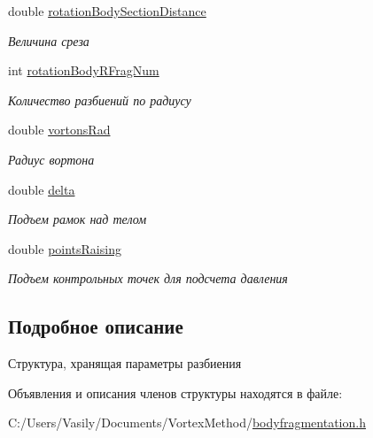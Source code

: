 \begin{DoxyCompactItemize}
double \mbox{\hyperlink{group__rotation_body_parameters_ga121bce6fb5cf863b3bd1e9249ee2b493}{rotation\+Body\+Section\+Distance}}
\begin{DoxyCompactList}\small\item\em Величина среза \end{DoxyCompactList}\item 
int \mbox{\hyperlink{group__rotation_bottom_cut_parameters_ga5e04e32e06f1344ec8761ec402b90ca6}{rotation\+Body\+R\+Frag\+Num}}
\begin{DoxyCompactList}\small\item\em Количество разбиений по радиусу \end{DoxyCompactList}\item 
double \mbox{\hyperlink{group__common_parameters_ga3d8bba533341948f927f1263580a5f17}{vortons\+Rad}}
\begin{DoxyCompactList}\small\item\em Радиус вортона \end{DoxyCompactList}\item 
double \mbox{\hyperlink{group__common_parameters_gafda7b876ebcf520d19b54db6fa00afff}{delta}}
\begin{DoxyCompactList}\small\item\em Подъем рамок над телом \end{DoxyCompactList}\item 
double \mbox{\hyperlink{group__common_parameters_ga3b7fdf07c6bb80f9c60caccde33f8a4e}{points\+Raising}}
\begin{DoxyCompactList}\small\item\em Подъем контрольных точек для подсчета давления \end{DoxyCompactList}\end{DoxyCompactItemize}


\subsection{Подробное описание}
Структура, хранящая параметры разбиения 

Объявления и описания членов структуры находятся в файле\+:\begin{DoxyCompactItemize}
\item 
C\+:/\+Users/\+Vasily/\+Documents/\+Vortex\+Method/\mbox{\hyperlink{bodyfragmentation_8h}{bodyfragmentation.\+h}}\end{DoxyCompactItemize}
